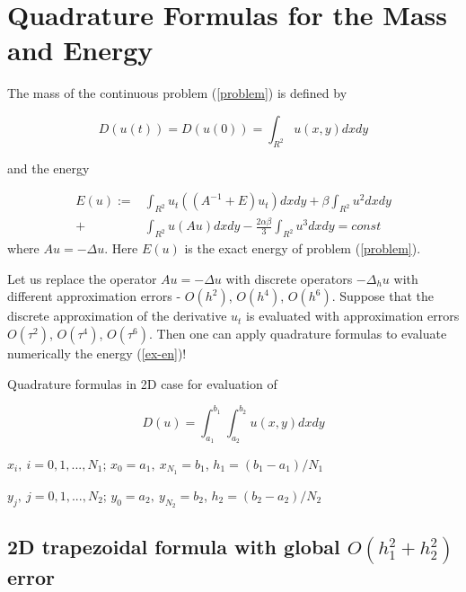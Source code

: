 \documentclass{article}
\newcommand{\rf}[1]{(\ref{#1})}
\begin{document}
\newpage

\section{Quadrature Formulas for the Mass and Energy}
The mass of the continuous problem \rf{problem} is defined by

\begin{equation}\label{int}
D(u(t))=D(u(0))=\int_{R^2} u(x,y)dx dy
\end{equation}

and the energy 

\begin{align}\label{ex-en}
E(u):=&\int_{R^2} u_t \left((A^{-1}+E)u_t\right) dxdy+
\beta \int_{R^2} u^2 dxdy \nonumber\\
+& \int_{R^2}u \left(A u\right) dxdy
-\frac{2 \alpha \beta}{3} \int_{R^2} u^3 dxdy =const
\end{align}
where $Au=-\Delta u$. Here $E(u)$ is the exact energy of problem \rf{problem}.

Let us replace the operator $Au=-
\Delta u$ with discrete operators $-\Delta_h u$ with different approximation errors - $O(h^2)$, $O(h^4)$, $O(h^6)$. Suppose that the discrete approximation of the derivative $u_t$ is evaluated with approximation errors $O(\tau^2)$, $O(\tau^4)$, $O(\tau^6)$. Then one can apply quadrature formulas to evaluate numerically the energy \rf{ex-en}!




Quadrature formulas in 2D case for evaluation of 

\begin{equation}\label{int}
D(u)=\int_{a_1}^{b_1} \int_{a_2}^{b_2} u(x,y)dx dy
\end{equation}

$x_i, ~i=0,1,...,N_1$; $x_0=a_1,~x_{N_1}=b_1$, $h_1=(b_1-a_1)/N_1$


$y_j, ~j=0,1,...,N_2$; $y_0=a_2,~y_{N_2}=b_2$,  $h_2=(b_2-a_2)/N_2$

\subsection{ 2D trapezoidal formula with global $O(h_1^2+h_2^2)$ error }
\end{document}
